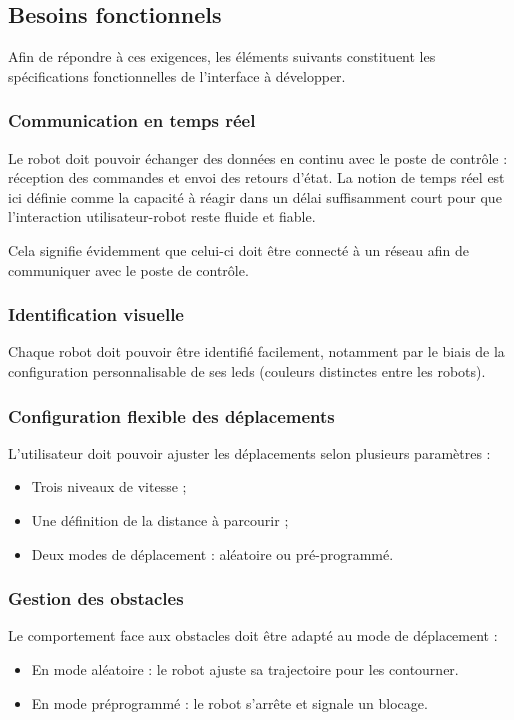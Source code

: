 \subsection{Besoins fonctionnels} \label{sec:specs}

Afin de répondre à ces exigences, les éléments suivants constituent les spécifications fonctionnelles de l’interface à développer.

\subsubsection{Communication en temps réel} 
Le robot doit pouvoir échanger des données en continu avec le poste de contrôle : réception des commandes et envoi des retours d’état.  
La notion de temps réel est ici définie comme la capacité à réagir dans un délai suffisamment court pour que l’interaction utilisateur-robot reste fluide et fiable.

Cela signifie évidemment que celui-ci doit être connecté à un réseau afin de communiquer avec le poste de contrôle.

\subsubsection{Identification visuelle}
Chaque robot doit pouvoir être identifié facilement, notamment par le biais de la configuration personnalisable de ses \acrshort{led}s (couleurs distinctes entre les robots).

\subsubsection{Configuration flexible des déplacements}
L’utilisateur doit pouvoir ajuster les déplacements selon plusieurs paramètres :
\begin{itemize}
    \item Trois niveaux de vitesse ;
    \item Une définition de la distance à parcourir ;
    \item Deux modes de déplacement : aléatoire ou pré-programmé.
\end{itemize}

\subsubsection{Gestion des obstacles}
Le comportement face aux obstacles doit être adapté au mode de déplacement :
\begin{itemize}
    \item En mode aléatoire : le robot ajuste sa trajectoire pour les contourner.
    \item En mode préprogrammé : le robot s’arrête et signale un blocage.
\end{itemize}

